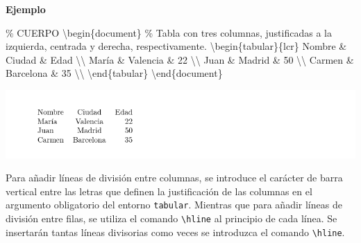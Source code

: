 \documentclass[
  letterpaper,
  DIV=11,
  numbers=noendperiod]{scrreport}
\newenvironment{Shaded}{\begin{snugshade}}{\end{snugshade}}
\newcommand{\CommentTok}[1]{\textcolor[rgb]{0.37,0.37,0.37}{#1}}
\newcommand{\ExtensionTok}[1]{\textcolor[rgb]{0.00,0.23,0.31}{#1}}
\newcommand{\FunctionTok}[1]{\textcolor[rgb]{0.28,0.35,0.67}{#1}}
\newcommand{\KeywordTok}[1]{\textcolor[rgb]{0.00,0.23,0.31}{#1}}
\newcommand{\NormalTok}[1]{\textcolor[rgb]{0.00,0.23,0.31}{#1}}
\newcommand{\OperatorTok}[1]{\textcolor[rgb]{0.37,0.37,0.37}{#1}}
\begin{document}
\textbf{Ejemplo}

\begin{Shaded}
\begin{Highlighting}[]
\CommentTok{\% CUERPO}
\KeywordTok{\textbackslash{}begin}\NormalTok{\{}\ExtensionTok{document}\NormalTok{\}}
\CommentTok{\% Tabla con tres columnas, justificadas a la izquierda, centrada y derecha, respectivamente.}
\KeywordTok{\textbackslash{}begin}\NormalTok{\{}\ExtensionTok{tabular}\NormalTok{\}\{lcr\}}
\NormalTok{Nombre }\OperatorTok{\&}\NormalTok{ Ciudad }\OperatorTok{\&}\NormalTok{ Edad }\FunctionTok{\textbackslash{}\textbackslash{}}
\NormalTok{María }\OperatorTok{\&}\NormalTok{ Valencia }\OperatorTok{\&}\NormalTok{ 22 }\FunctionTok{\textbackslash{}\textbackslash{}}
\NormalTok{Juan }\OperatorTok{\&}\NormalTok{ Madrid }\OperatorTok{\&}\NormalTok{ 50 }\FunctionTok{\textbackslash{}\textbackslash{}}
\NormalTok{Carmen }\OperatorTok{\&}\NormalTok{ Barcelona }\OperatorTok{\&}\NormalTok{ 35 }\FunctionTok{\textbackslash{}\textbackslash{}}
\KeywordTok{\textbackslash{}end}\NormalTok{\{}\ExtensionTok{tabular}\NormalTok{\}}
\KeywordTok{\textbackslash{}end}\NormalTok{\{}\ExtensionTok{document}\NormalTok{\}}
\end{Highlighting}
\end{Shaded}

\begin{tcolorbox}[enhanced jigsaw, colback=white, colframe=quarto-callout-note-color-frame, title={Salida}, bottomtitle=1mm, colbacktitle=quarto-callout-note-color!10!white, bottomrule=.15mm, titlerule=0mm, opacityback=0, toptitle=1mm, arc=.35mm, left=2mm, rightrule=.15mm, toprule=.15mm, coltitle=black, leftrule=.75mm, opacitybacktitle=0.6, breakable]
\includegraphics{./img/tablas/tabla-simple.png}
\end{tcolorbox}

Para añadir líneas de división entre columnas, se introduce el carácter
de barra vertical \texttt{\textbar{}} entre las letras que definen la
justificación de las columnas en el argumento obligatorio del entorno
\texttt{tabular}. Mientras que para añadir líneas de división entre
filas, se utiliza el comando \texttt{\textbackslash{}hline} al principio
de cada línea. Se insertarán tantas líneas divisorias como veces se
introduzca el comando \texttt{\textbackslash{}hline}.
\end{document}
